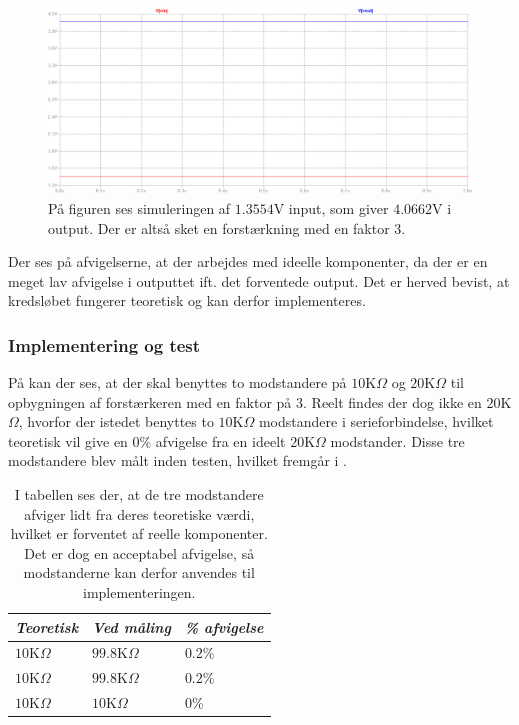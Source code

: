 \begin{figure}[H]
	\centering
	\includegraphics[scale=0.4]{figures/cProblemloesning/Forstaerker_faktor3_simulering.PNG}
	\caption{På figuren ses simuleringen af $1.3554$V input, som giver $4.0662$V i output. Der er altså sket en forstærkning med en faktor $3$.}
	\label{fig:faktor3_simulering}
\end{figure}
\noindent Der ses på afvigelserne, at der arbejdes med ideelle komponenter, da der er en meget lav afvigelse i outputtet ift. det forventede output. Det er herved bevist, at kredsløbet fungerer teoretisk og kan derfor implementeres.

\subsubsection{Implementering og test}
På  kan der ses, at der skal benyttes to modstandere på $10$K$\Omega$ og $20$K$\Omega$ til opbygningen af forstærkeren med en faktor på 3. Reelt findes der dog ikke en $20$K$\Omega$, hvorfor der istedet benyttes to $10$K$\Omega$ modstandere i serieforbindelse, hvilket teoretisk vil give en $0$\% afvigelse fra en ideelt $20$K$\Omega$ modstander. Disse tre modstandere blev målt inden testen, hvilket fremgår i .
\begin{table}[H]
	\centering
	\begin{tabular}{|l|l|l|}
		\hline
		\textit{Teoretisk}  & \textit{Ved måling} & \textit{\% afvigelse} \\ \hline
		$10$K$\Omega$       & $99.8$K$\Omega$     & $0.2$\%               \\ \hline
		$10$K$\Omega$       & $99.8$K$\Omega$     & $0.2$\%               \\ \hline
		$10$K$\Omega$       & $10$K$\Omega$       & $0$\%               \\ \hline
	\end{tabular}
	\caption{I tabellen ses der, at de tre modstandere afviger lidt fra deres teoretiske værdi, hvilket er forventet af reelle komponenter. Det er dog en acceptabel afvigelse, så modstanderne kan derfor anvendes til implementeringen.}
	\label{Tab:modstand_faktor18}
\end{table}

